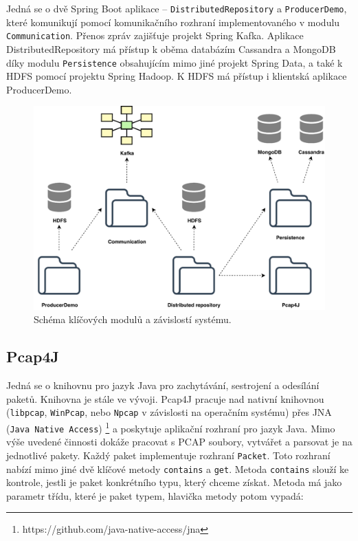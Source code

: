 Jedná se o dvě Spring Boot aplikace -- \texttt{DistributedRepository} a \texttt{ProducerDemo}, které komunikují pomocí komunikačního rozhraní implementovaného v modulu \texttt{Communication}. Přenos zpráv zajišťuje projekt Spring Kafka. Aplikace DistributedRepository má přístup k oběma databázím Cassandra a MongoDB díky modulu \texttt{Persistence} obsahujícím mimo jiné projekt Spring Data, a také k HDFS pomocí projektu Spring Hadoop. K HDFS má přístup i klientská aplikace ProducerDemo.

\begin{figure}[!h]
  \centering
  \includegraphics[width=12.3cm]{template-fig/Architecture.pdf}
  \caption{Schéma klíčových modulů a závislostí systému.}
  \label{FIG_Architecture}
\end{figure}

\subsection{Pcap4J} \label{pcap4j}
Jedná se o knihovnu pro jazyk Java pro zachytávání, sestrojení a odesílání paketů. Knihovna je stále ve vývoji. Pcap4J pracuje nad nativní knihovnou (\texttt{libpcap}, \texttt{WinPcap}, nebo \texttt{Npcap} v závislosti na operačním systému) přes JNA (\texttt{Java Native Access})
\footnote{https://github.com/java-native-access/jna}
a poskytuje aplikační rozhraní pro jazyk Java. Mimo výše uvedené činnosti dokáže pracovat s PCAP soubory, vytvářet a parsovat je na jednotlivé pakety. Každý paket implementuje rozhraní \texttt{Packet}. Toto rozhraní nabízí mimo jiné dvě klíčové metody \texttt{contains} a \texttt{get}. Metoda \texttt{contains} slouží ke kontrole, jestli je paket konkrétního typu, který chceme získat. Metoda má jako parametr třídu, které je paket typem, hlavička metody potom vypadá:

